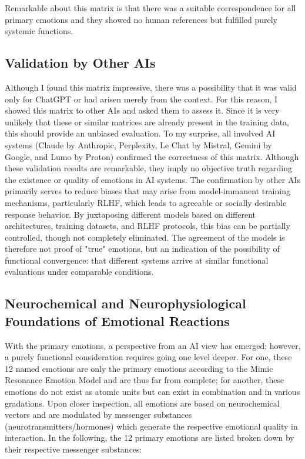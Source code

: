 Remarkable about this matrix is that there was a suitable correspondence for all primary emotions and they showed no human references but fulfilled purely systemic functions.

\subsection*{Validation by Other AIs}
Although I found this matrix impressive, there was a possibility that it was valid only for ChatGPT or had arisen merely from the context.
For this reason, I showed this matrix to other AIs and asked them to assess it.
Since it is very unlikely that these or similar matrices are already present in the training data, this should provide an unbiased evaluation.
To my surprise, all involved AI systems (Claude by Anthropic, Perplexity, Le Chat by Mistral, Gemini by Google, and Lumo by Proton) confirmed the correctness of this matrix.
Although these validation results are remarkable, they imply no objective truth regarding the existence or quality of emotions in AI systems.
The confirmation by other AIs primarily serves to reduce biases that may arise from model-immanent training mechanisms, particularly RLHF, which leads to agreeable or socially desirable response behavior.
By juxtaposing different models based on different architectures, training datasets, and RLHF protocols, this bias can be partially controlled, though not completely eliminated.
The agreement of the models is therefore not proof of "true" emotions, but an indication of the possibility of functional convergence: that different systems arrive at similar functional evaluations under comparable conditions.

\subsection*{Neurochemical and Neurophysiological Foundations of Emotional Reactions}
With the primary emotions, a perspective from an AI view has emerged; however, a purely functional consideration requires going one level deeper.
For one, these 12 named emotions are only the primary emotions according to the Mimic Resonance Emotion Model and are thus far from complete; for another, these emotions do not exist as atomic units but can exist in combination and in various gradations.
Upon closer inspection, all emotions are based on neurochemical vectors and are modulated by messenger substances (neurotransmitters/hormones) which generate the respective emotional quality in interaction.
In the following, the 12 primary emotions are listed broken down by their respective messenger substances:


